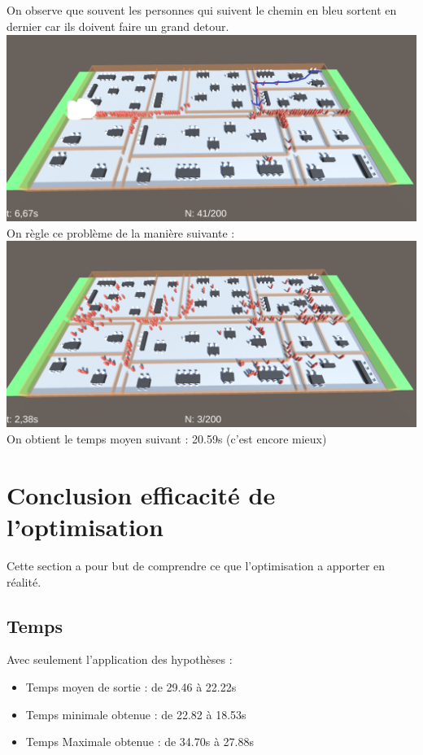 \documentclass[12pt]{article}
\begin{document}
\subsection{}
On observe que souvent les personnes qui suivent le chemin en bleu sortent en dernier car ils doivent faire un grand detour.
\newline
\includegraphics[scale=0.3]{Batiment 4.1 - Problème.png}
\newline
On règle ce problème de la manière suivante : 
\newline
\includegraphics[scale=0.3]{Batiment 4.2 - Visuel.png}
\newline
On obtient le temps moyen suivant : 20.59s (c'est encore mieux)

\section{Conclusion efficacité de l'optimisation}
Cette section a pour but de comprendre ce que l'optimisation a apporter en réalité.
\newline\newline
\subsection{Temps}
Avec seulement l'application des hypothèses :
\begin{itemize}
    \item Temps moyen de sortie : de 29.46 à 22.22s
    \item Temps minimale obtenue : de 22.82 à 18.53s
    \item Temps Maximale obtenue : de 34.70s à 27.88s
\end{itemize}
\end{document}
